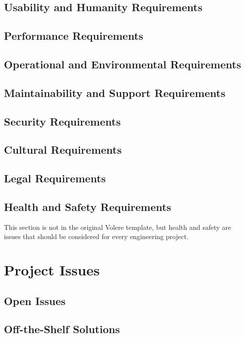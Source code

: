 \documentclass[12pt, titlepage]{article}
\begin{document}
\subsection{Usability and Humanity Requirements}

\subsection{Performance Requirements}

\subsection{Operational and Environmental Requirements}

\subsection{Maintainability and Support Requirements}

\subsection{Security Requirements}

\subsection{Cultural Requirements}

\subsection{Legal Requirements}

\subsection{Health and Safety Requirements}

This section is not in the original Volere template, but health and safety are
issues that should be considered for every engineering project.

\section{Project Issues}

\subsection{Open Issues}

\subsection{Off-the-Shelf Solutions}
\end{document}
